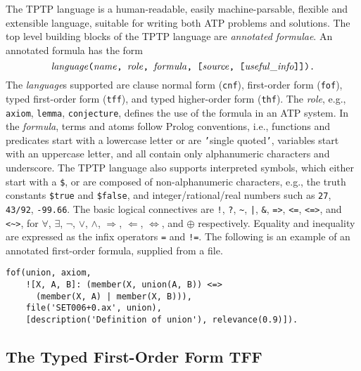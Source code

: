 The TPTP language is a human-readable, easily machine-parsable, flexible and
extensible language, suitable for writing both ATP problems and solutions.
The top level building blocks of the TPTP language are {\em annotated 
formulae}.
An annotated formula has the form $$\mathit{language}\text{\tt(}\mathit{name}\text{\tt, }\mathit{role}\text{\tt, }\mathit{formula}\text{\tt, [}\mathit{source}\text{\tt, [}\mathit{useful\_info}\text{\tt]]).}$$
The {\em language}s supported are clause normal form (\lstinline'cnf'),
first-order form (\lstinline'fof'), typed first-order form (\lstinline'tff'), and
typed higher-order form (\lstinline'thf').
The {\em role}, e.g., \lstinline'axiom', \lstinline'lemma', \lstinline'conjecture',
defines the use of the formula in an ATP system.
In the {\em formula}, terms and atoms follow Prolog conventions, i.e.,
functions and predicates start with a lowercase letter or are {\tt '}single
quoted{\tt '}, variables start with an uppercase letter, and all
contain only alphanumeric characters and underscore.
The TPTP language also supports interpreted symbols, which either start with a
\lstinline'$', or are composed of non-alphanumeric characters, e.g., the truth
constants \lstinline'$true' and \lstinline'$false', and integer/rational/real
numbers such as \lstinline'27', \lstinline'43/92', \lstinline'-99.66'.
The basic logical connectives are
\lstinline'!', \lstinline'?', \lstinline'~', \lstinline'|', \lstinline'&', \lstinline'=>', \lstinline'<=',
\lstinline'<=>', and \lstinline'<~>',
for
$\forall$, $\exists$, $\neg$, $\vee$, $\wedge$, $\Rightarrow$, $\Leftarrow$,
$\Leftrightarrow$, and $\oplus$ respectively.
Equality and inequality are expressed as the infix operators \lstinline'=' and
\lstinline'!='.
The following is an example of an annotated first-order formula, supplied from a file.
\begin{lstlisting}[language=tptp]
fof(union, axiom,
    ![X, A, B]: (member(X, union(A, B)) <=>
      (member(X, A) | member(X, B))),
    file('SET006+0.ax', union),
    [description('Definition of union'), relevance(0.9)]).
\end{lstlisting}

\subsection{The Typed First-Order Form TFF}
\label{sec:tfx/TFF}

